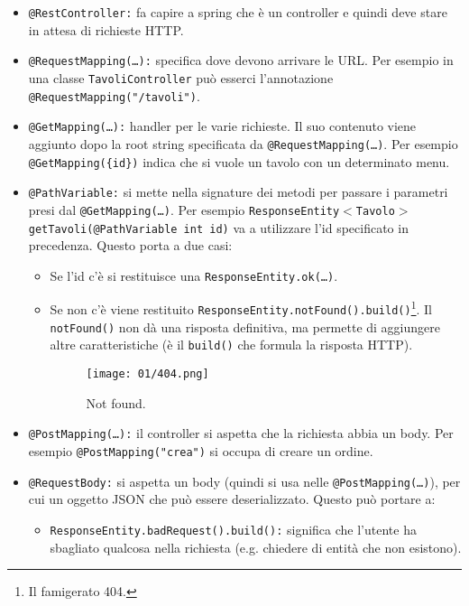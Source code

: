 \begin{itemize}
	\item \texttt{@RestController:} fa capire a spring che è un controller e quindi deve stare in attesa di richieste HTTP.
	\item \texttt{@RequestMapping(\dots):} specifica dove devono arrivare le URL. Per esempio in una classe \texttt{TavoliController} può esserci l'annotazione \texttt{@RequestMapping("/tavoli")}.
	\item \texttt{@GetMapping(\dots):} handler per le varie richieste. Il suo contenuto viene aggiunto dopo la root string specificata da \texttt{@RequestMapping(\dots)}. Per esempio \texttt{@GetMapping(\{id\})} indica che si vuole un tavolo con un determinato menu.
	\item \texttt{@PathVariable:} si mette nella signature dei metodi per passare i parametri presi dal \texttt{@GetMapping(\dots)}. Per esempio \texttt{ResponseEntity$<$Tavolo$>$ getTavoli(@PathVariable int id)} va a utilizzare l'id specificato in precedenza. Questo porta a due casi:
	      \begin{itemize}
		      \item Se l'id c'è si restituisce una \texttt{ResponseEntity.ok(\dots)}.
		      \item Se non c'è viene restituito \texttt{ResponseEntity.notFound().build()}\footnote{Il famigerato 404.}. Il \texttt{notFound()} non dà una risposta definitiva, ma permette di aggiungere  altre caratteristiche (è il \texttt{build()} che formula la risposta HTTP).
		            \begin{figure}[h]
			            \begin{center}
				            \texttt{[image: 01/404.png]}
			            \end{center}
			            \caption{Not found.}
		            \end{figure}
	      \end{itemize}
	\item \texttt{@PostMapping(\dots):} il controller si aspetta che la richiesta abbia un body. Per esempio \texttt{@PostMapping("crea")} si occupa di creare un ordine.
	\item \texttt{@RequestBody:} si aspetta un body (quindi si usa nelle \texttt{@PostMapping(\dots)}), per cui un oggetto JSON che può essere deserializzato. Questo può portare a:
	      \begin{itemize}
		      \item \texttt{ResponseEntity.badRequest().build():} significa che l'utente ha sbagliato qualcosa nella richiesta (e.g. chiedere di entità che non esistono).

\end{itemize}
\end{itemize}
